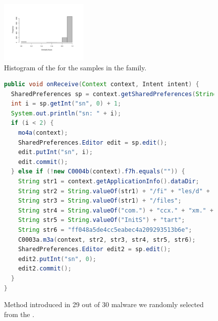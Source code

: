 \begin{figure}
\begin{center}
    \includegraphics[width=0.38\textwidth]{images/similarityGappusin_V2.pdf}
  \end{center}
  \caption{Histogram of the \sscore for the samples in the \gps family.}
  \label{fig:hist-gappusin}
\end{figure}  

\begin{figure}
\begin{lstlisting}[language=Java]
public void onReceive(Context context, Intent intent) {
  SharedPreferences sp = context.getSharedPreferences(String.valueOf("com.")+"game."+"param",0);
  int i = sp.getInt("sn", 0) + 1;
  System.out.println("sn: " + i);
  if (i < 2) {
    mo4a(context);
    SharedPreferences.Editor edit = sp.edit();
    edit.putInt("sn", i);
    edit.commit();
  } else if (!new C0004b(context).f7h.equals("")) {
    String str1 = context.getApplicationInfo().dataDir;
    String str2 = String.valueOf(str1) + "/fi" + "les/d" + "ata.a" + "pk";
    String str3 = String.valueOf(str1) + "/files";
    String str4 = String.valueOf("com.") + "ccx." + "xm." + "SDKS" + "tart";
    String str5 = String.valueOf("InitS") + "tart";
    String str6 = "ff048a5de4cc5eabec4a209293513b6e";    
    C0003a.m3a(context, str2, str3, str4, str5, str6);
    SharedPreferences.Editor edit2 = sp.edit();
    edit2.putInt("sn", 0);
    edit2.commit();
  }
}
\end{lstlisting}
\caption{Method introduced in 29 out of 30 \gps malware we randomly selected from the \cds.}
\label{code:onReceive}
\end{figure}

